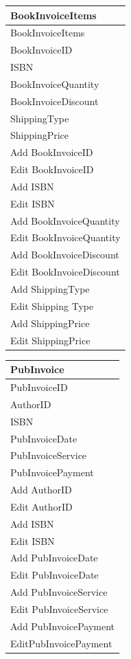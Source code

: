 \begin{tabular}{|p{4cm}|}
    \hline
    \textbf{BookInvoiceItems} \\ \hline
    BookInvoiceItems \\ BookInvoiceID \\ ISBN \\ BookInvoiceQuantity \\ BookInvoiceDiscount \\ ShippingType \\ ShippingPrice \\ \hline
    Add BookInvoiceID \\ Edit BookInvoiceID \\ Add ISBN \\ Edit ISBN \\ Add BookInvoiceQuantity \\ Edit BookInvoiceQuantity \\ Add BookInvoiceDiscount \\ Edit BookInvoiceDiscount \\ Add ShippingType \\ Edit Shipping Type \\ Add ShippingPrice \\ Edit ShippingPrice \\ \hline
\end{tabular}

\begin{tabular}{|p{4cm}|}
    \hline
    \textbf{PubInvoice} \\ \hline
    PubInvoiceID \\ AuthorID \\ ISBN \\ PubInvoiceDate \\ PubInvoiceService \\ PubInvoicePayment \\ \hline
    Add AuthorID \\ Edit AuthorID \\ Add ISBN \\ Edit ISBN \\ Add PubInvoiceDate \\ Edit PubInvoiceDate \\ Add PubInvoiceService \\ Edit PubInvoiceService \\ Add PubInvoicePayment \\ EditPubInvoicePayment \\ \hline
\end{tabular}

